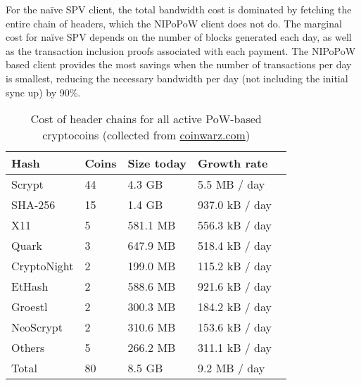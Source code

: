 For the na\"ive SPV client, the total bandwidth cost is dominated by fetching
the entire chain of headers, which the NIPoPoW client does not do. The marginal
cost for na\"ive SPV depends on the number of blocks generated each day, as well
as the transaction inclusion proofs associated with each payment. The NIPoPoW
based client provides the most savings when the number of transactions per day
is smallest, reducing the necessary bandwidth per day (not including the initial
sync up) by 90\%.

\begin{table}
  \caption{Cost of header chains for all active PoW-based cryptocoins
           (collected from \url{coinwarz.com})}
  \label{tbl.currencies}
  \small
  \centering
  \begin{tabular}{l|l|l|l}
    {\bf Hash} & {\bf Coins} & {\bf Size today} & {\bf Growth rate}  \\
    \hline
    Scrypt  & 44  & 4.3 GB  & 5.5 MB / day \  \\
    SHA-256  & 15  & 1.4 GB  & 937.0 kB / day \  \\
    X11  & 5  & 581.1 MB  & 556.3 kB / day \  \\
    Quark  & 3  & 647.9 MB  & 518.4 kB / day \  \\
    CryptoNight  & 2  & 199.0 MB  & 115.2 kB / day \  \\
    EtHash  & 2  & 588.6 MB  & 921.6 kB / day \  \\
    Groestl  & 2  & 300.3 MB  & 184.2 kB / day \  \\
    NeoScrypt  & 2  & 310.6 MB  & 153.6 kB / day \  \\
    Others  & 5  & 266.2 MB  & 311.1 kB / day \  \\
    \hline
    Total  & 80   &  8.5 GB  & 9.2 MB  / day  \\
  \end{tabular}
\end{table}

